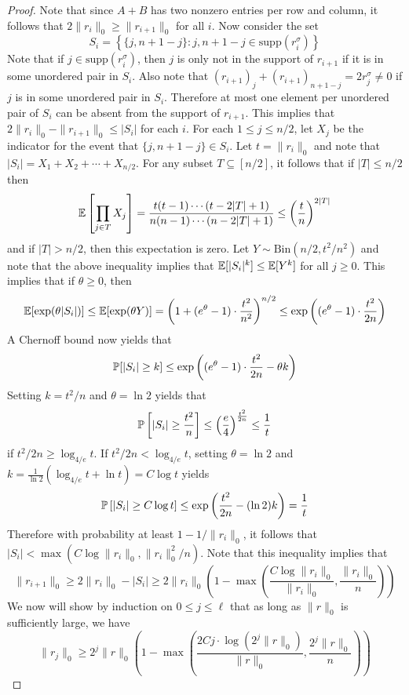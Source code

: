 \documentclass[11pt]{article}
\begin{document}
\begin{proof}
Note that since $A + B$ has two nonzero entries per row and column, it follows that $2\| r_i \|_0 \ge \| r_{i+1} \|_0$ for all $i$. Now consider the set
$$S_i = \left\{ \{j, n + 1 - j\} : j, n+1 - j \in \text{supp}\left(r_i^\sigma\right) \right\}$$
Note that if $j \in \text{supp}\left(r_i^\sigma\right)$, then $j$ is only not in the support of $r_{i+1}$ if it is in some unordered pair in $S_i$. Also note that $(r_{i+1})_j + (r_{i+1})_{n+1 - j} = 2r^\sigma_j \neq 0$ if $j$ is in some unordered pair in $S_i$. Therefore at most one element per unordered pair of $S_i$ can be absent from the support of $r_{i+1}$. This implies that $2\| r_i \|_0 - \| r_{i+1} \|_0 \le |S_i|$ for each $i$. For each $1 \le j \le n/2$, let $X_j$ be the indicator for the event that $\{j, n+1 - j\} \in S_i$. Let $t = \| r_i \|_0$ and note that $|S_i| = X_1 + X_2 + \cdots + X_{n/2}$. For any subset $T \subseteq [n/2]$, it follows that if $|T| \le n/2$ then
$$\mathbb{E}\left[ \prod_{j \in T} X_j \right] = \frac{t(t-1)\cdots(t - 2|T| + 1)}{n(n-1)\cdots(n - 2|T| + 1)} \le \left( \frac{t}{n} \right)^{2|T|}$$
and if $|T| > n/2$, then this expectation is zero. Let $Y \sim \text{Bin}(n/2, t^2/n^2)$ and note that the above inequality implies that $\mathbb{E}[|S_i|^k] \le \mathbb{E}[Y^k]$ for all $j \ge 0$. This implies that if $\theta \ge 0$, then
$$\mathbb{E}[\exp(\theta |S_i|)] \le \mathbb{E}[\exp(\theta Y)] = \left( 1 + (e^\theta - 1) \cdot \frac{t^2}{n^2} \right)^{n/2} \le \exp\left( (e^\theta - 1) \cdot \frac{t^2}{2n} \right)$$
A Chernoff bound now yields that
$$\mathbb{P}[|S_i| \ge k] \le \exp\left( (e^\theta - 1) \cdot \frac{t^2}{2n} - \theta k \right)$$
Setting $k = t^2/n$ and $\theta = \ln 2$ yields that
$$\mathbb{P}\left[|S_i| \ge \frac{t^2}{n}\right] \le \left( \frac{e}{4} \right)^{\frac{t^2}{2n}} \le \frac{1}{t}$$
if $t^2/2n \ge \log_{4/e} t$. If $t^2/2n < \log_{4/e} t$, setting $\theta = \ln 2$ and $k = \frac{1}{\ln 2} \left( \log_{4/e} t + \ln t \right) = C\log t$ yields
$$\mathbb{P}\left[|S_i| \ge C \log t \right] \le \exp\left( \frac{t^2}{2n} - (\ln 2) k \right) = \frac{1}{t}$$
Therefore with probability at least $1 - 1/\| r_i \|_0$, it follows that $|S_i| < \max(C\log \| r_i \|_0, \| r_i \|_0^2/n)$. Note that this inequality implies that
$$\| r_{i+1} \|_0 \ge 2\| r_i \|_0 - |S_i| \ge 2\| r_i \|_0 \left(1 - \max\left(\frac{C \log \| r_i \|_0}{\| r_i\|_0}, \frac{\| r_i \|_0}{n}\right) \right)$$
We now will show by induction on $0 \le j \le \ell$ that as long as $\|r \|_0$ is sufficiently large, we have
\begin{equation}
\| r_j \|_0 \ge 2^j \| r \|_0 \left( 1 - \max\left(\frac{2Cj \cdot \log (2^j \| r \|_0)}{\| r \|_0}, \frac{2^j \| r \|_0}{n}\right) \right)

\end{equation}
\end{proof}
\end{document}
